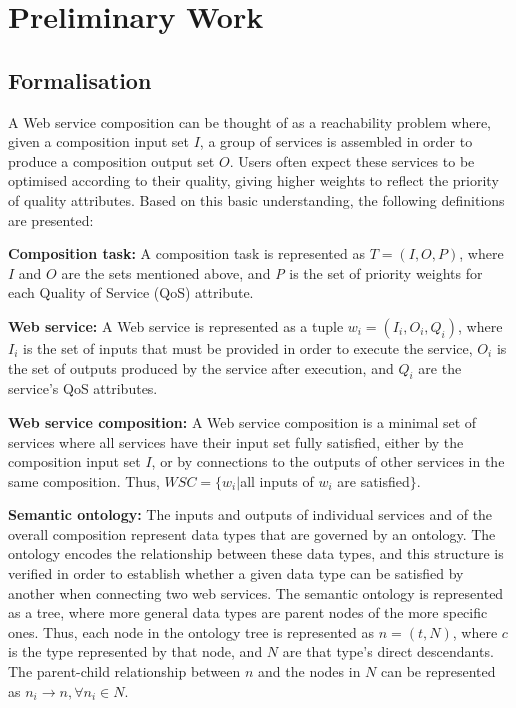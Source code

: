 \chapter{Preliminary Work}\label{C:preliminary}

\section{Formalisation}
A Web service composition can be thought of as a reachability problem where, given a composition input set $I$, a group of services is assembled in order to produce a composition output set $O$. Users often expect these services to be optimised according to their quality, giving higher weights to reflect the priority of quality attributes. Based on this basic understanding, the following definitions are presented:

\textbf{Composition task:} A composition task is represented as $T = (I, O, P)$, where $I$ and $O$ are the sets mentioned above, and \textit{P} is the set of priority weights for each Quality of Service (QoS) attribute.

\textbf{Web service:} A Web service is represented as a tuple $w_i = (I_i, O_i, Q_i)$, where $I_i$ is the set of inputs that must be provided in order to execute the service, $O_i$ is the set of outputs produced by the service after execution, and $Q_i$ are the service's QoS attributes.

\textbf{Web service composition:} A Web service composition is a minimal set of services where all services have their input set fully satisfied, either by the composition input set $I$, or by connections to the outputs of other services in the same composition. Thus, $WSC = \{w_i | $all inputs of $w_i$ are satisfied$\}$.

\textbf{Semantic ontology:} The inputs and outputs of individual services and of the overall composition represent data types that are governed by an ontology. The ontology encodes the relationship between these data types, and this structure is verified in order to establish whether a given data type can be satisfied by another when connecting two web services. The semantic ontology is represented as a tree, where more general data types are parent nodes of the more specific ones. Thus, each node in the ontology tree is represented as $n = (t, N)$, where $c$ is the type represented by that node, and $N$ are that type's direct descendants. The parent-child relationship between $n$ and the nodes in $N$ can be represented as $n_i \rightarrow n, \forall n_i \in N$.

